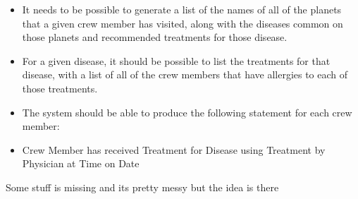 \documentclass{report}
\begin{document}
\begin{mdframed}
\begin{itemize}
            \item It needs to be possible to generate a list of the names of all of the planets that a given crew member has visited, along with the diseases common on those planets and recommended treatments for those disease.
            \item For a given disease, it should be possible to list the treatments for that disease, with a list of all of the crew members that have allergies to each of those treatments.
            \item The system should be able to produce the following statement for each crew member:
            \item Crew Member has received Treatment for Disease using Treatment by Physician at Time on Date
        \end{itemize}
    \end{mdframed}
    \begin{figure}[ht]
        \centering
        \label{fig:1}
    \end{figure}
    \bigbreak \noindent 
    Some stuff is missing and its pretty messy but the idea is there

    
\end{document}

